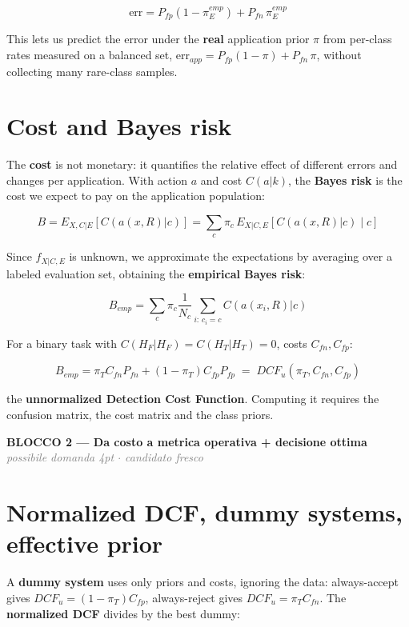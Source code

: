 $$\text{err} = P_{fp}(1-\pi^{emp}_E) + P_{fn}\,\pi^{emp}_E$$

This lets us predict the error under the \textbf{real} application prior $\pi$ from per-class rates measured on a balanced set, $\text{err}_{app} = P_{fp}(1-\pi) + P_{fn}\,\pi$, without collecting many rare-class samples.

\section*{Cost and Bayes risk}

The \textbf{cost} is not monetary: it quantifies the relative effect of different errors and changes per application. With action $a$ and cost $C(a|k)$, the \textbf{Bayes risk} is the cost we expect to pay on the application population:

$$B = E_{X,C|E}[C(a(x,R)|c)] = \sum_{c} \pi_c\, E_{X|C,E}[C(a(x,R)|c)\mid c]$$

Since $f_{X|C,E}$ is unknown, we approximate the expectations by averaging over a labeled evaluation set, obtaining the \textbf{empirical Bayes risk}:

$$B_{emp} = \sum_{c} \pi_c \frac{1}{N_c}\sum_{i:\,c_i=c} C(a(x_i,R)|c)$$

For a binary task with $C(H_F|H_F)=C(H_T|H_T)=0$, costs $C_{fn}, C_{fp}$:

$$B_{emp} = \pi_T C_{fn} P_{fn} + (1-\pi_T) C_{fp} P_{fp} \;=\; DCF_u(\pi_T, C_{fn}, C_{fp})$$

the \textbf{unnormalized Detection Cost Function}. Computing it requires the confusion matrix, the cost matrix and the class priors.

\begin{tcolorbox}[colback=green!6, colframe=green!45!black, sharp corners, boxrule=1pt, left=2mm, right=2mm, top=1mm, bottom=1mm, enhanced, breakable]
\textbf{\textcolor{green!45!black}{BLOCCO 2 --- Da costo a metrica operativa + decisione ottima}} \hfill \textcolor{gray}{\footnotesize\textit{possibile domanda 4pt $\cdot$ candidato fresco}}
\end{tcolorbox}

\section*{Normalized DCF, dummy systems, effective prior}

A \textbf{dummy system} uses only priors and costs, ignoring the data: always-accept gives $DCF_u=(1-\pi_T)C_{fp}$, always-reject gives $DCF_u=\pi_T C_{fn}$. The \textbf{normalized DCF} divides by the best dummy:

